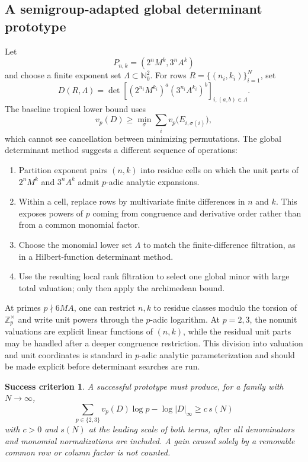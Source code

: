 \documentclass[10pt,letterpaper]{article}
\newtheorem{criterion}{Success criterion}[section]
\newcommand{\Z}{\mathbb Z}
\newcommand{\N}{\mathbb N}
\begin{document}
\subsection{A semigroup-adapted global determinant prototype}

Let
\[
  P_{n,k}=(2^nM^k,3^nA^k)
\]
and choose a finite exponent set \(\Lambda\subset\N_0^2\).  For rows
\(R=\{(n_i,k_i)\}_{i=1}^N\), set
\[
  D(R,\Lambda)=\det\!\left[
    (2^{n_i}M^{k_i})^a(3^{n_i}A^{k_i})^b
  \right]_{i,(a,b)\in\Lambda}.
\]
The baseline tropical lower bound uses
\[
  v_p(D)\geq
  \min_{\sigma}\sum_i v_p\bigl(E_{i,\sigma(i)}\bigr),
\]
which cannot see cancellation between minimizing permutations.  The global determinant
method suggests a different sequence of operations:

\begin{enumerate}
\item Partition exponent pairs \((n,k)\) into residue cells on which the unit parts of
\(2^nM^k\) and \(3^nA^k\) admit \(p\)-adic analytic expansions.
\item Within a cell, replace rows by multivariate finite differences in \(n\) and \(k\).
This exposes powers of \(p\) coming from congruence and derivative order rather than from a
common monomial factor.
\item Choose the monomial lower set \(\Lambda\) to match the finite-difference filtration, as
in a Hilbert-function determinant method.
\item Use the resulting local rank filtration to select one global minor with large total
valuation; only then apply the archimedean bound.
\end{enumerate}

At primes \(p\nmid6MA\), one can restrict \(n,k\) to residue classes modulo the torsion of
\(\Z_p^\times\) and write unit powers through the \(p\)-adic logarithm.  At \(p=2,3\), the
nonunit valuations are explicit linear functions of \((n,k)\), while the residual unit parts
may be handled after a deeper congruence restriction.  This division into valuation and unit
coordinates is standard in \(p\)-adic analytic parameterization and should be made explicit
before determinant searches are run.

\begin{criterion}
A successful prototype must produce, for a family with \(N\to\infty\),
\[
  \sum_{p\in\{2,3\}}v_p(D)\log p-\log|D|_\infty
  \geq c\,s(N)
\]
with \(c>0\) and \(s(N)\) at the leading scale of both terms, after all denominators and
monomial normalizations are included.  A gain caused solely by a removable common row or
column factor is not counted.
\end{criterion}
\end{document}
